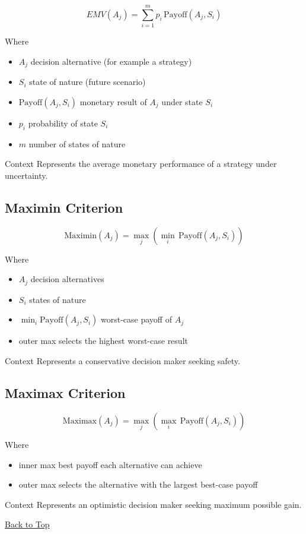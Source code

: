 \documentclass[11pt]{article}
\begin{document}
	\[
	EMV(A_j) = \sum_{i=1}^{m} p_i \,\text{Payoff}(A_j,S_i)
	\]
	
	Where
	\begin{itemize}
		\item \(A_j\) decision alternative (for example a strategy)
		\item \(S_i\) state of nature (future scenario)
		\item \(\text{Payoff}(A_j,S_i)\) monetary result of \(A_j\) under state \(S_i\)
		\item \(p_i\) probability of state \(S_i\)
		\item \(m\) number of states of nature
	\end{itemize}
	
	Context
	Represents the average monetary performance of a strategy under uncertainty.
	
	\subsection{Maximin Criterion}\label{formula-maximin}
	
	\[
	\text{Maximin}(A_j) = \max_j \left( \min_i \,\text{Payoff}(A_j,S_i) \right)
	\]
	
	Where
	\begin{itemize}
		\item \(A_j\) decision alternatives
		\item \(S_i\) states of nature
		\item \(\min_i \text{Payoff}(A_j,S_i)\) worst-case payoff of \(A_j\)
		\item outer max selects the highest worst-case result
	\end{itemize}
	
	Context
	Represents a conservative decision maker seeking safety.
	
	\subsection{Maximax Criterion}\label{formula-maximax}
	
	\[
	\text{Maximax}(A_j) = \max_j \left( \max_i \,\text{Payoff}(A_j,S_i) \right)
	\]
	
	Where
	\begin{itemize}
		\item inner max best payoff each alternative can achieve
		\item outer max selects the alternative with the largest best-case payoff
	\end{itemize}
	
	Context
	Represents an optimistic decision maker seeking maximum possible gain.
	
	\vspace{6pt}
	\noindent\hyperref[table-of-contents]{Back to Top}
	
\end{document}
